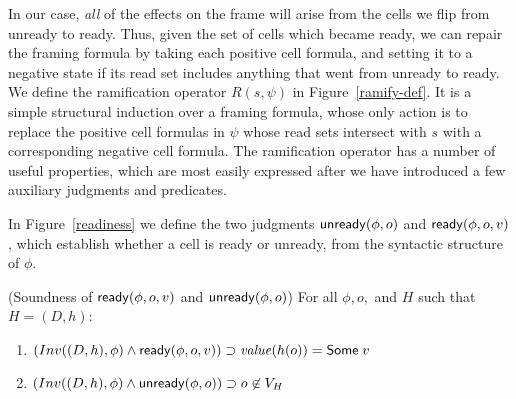 In our case, \emph{all} of the effects on the frame will arise from
the cells we flip from unready to ready. Thus, given the set of cells
which became ready, we can repair the framing formula by taking each
positive cell formula, and setting it to a negative state if its read
set includes anything that went from unready to ready. We define the
ramification operator $R(s, \psi)$ in Figure~\ref{ramify-def}.  It is
a simple structural induction over a framing formula, whose only
action is to replace the positive cell formulas in $\psi$ whose read
sets intersect with $s$ with a corresponding negative cell formula.
The ramification operator has a number of useful properties, which are
most easily expressed after we have introduced a few auxiliary
judgments and predicates.

In Figure~\ref{readiness} we define the two judgments $\mathsf{unready}({\phi}, {o})$
and $\mathsf{ready}({\phi}, {o}, {v})$, which establish whether a cell is ready or
unready, from the syntactic structure of $\phi$. 

\begin{prop}{(Soundness of $\mathsf{ready}({\phi}, {o}, {v})$ and $\mathsf{unready}({\phi}, {o})$)}
For all $\phi, o,$ and $H$ such that $H = (D,h)$:

\begin{enumerate}
\item $(Inv((D,h), \phi) \land \mathsf{ready}({\phi}, {o}, {v})) \supset \mathit{value}(h(o)) = \mathsf{Some}\;v$
\item $(Inv((D,h), \phi) \land \mathsf{unready}({\phi}, {o})) \supset o \not\in V_H$
\end{enumerate}
\end{prop}

